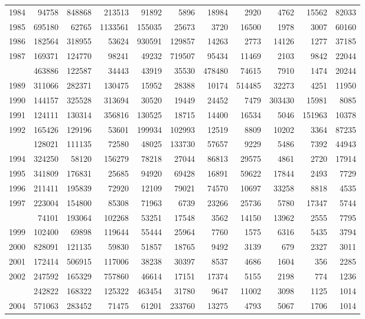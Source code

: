 \documentclass[
]{article}
\begin{document}
\begin{longtable}[t]{lrrrrrrrrrr}
1984 & 94758 & 848868 & 213513 & 91892 & 5896 & 18984 & 2920 & 4762 & 15562 & 82033\\
1985 & 695180 & 62765 & 1133561 & 155035 & 25673 & 3720 & 16500 & 1978 & 3007 & 60160\\
1986 & 182564 & 318955 & 53624 & 930591 & 129857 & 14263 & 2773 & 14126 & 1277 & 37185\\
1987 & 169371 & 124770 & 98241 & 49232 & 719507 & 95434 & 11469 & 2103 & 9842 & 22044\\
\addlinespace
1988 & 463886 & 122587 & 34443 & 43919 & 35530 & 478480 & 74615 & 7910 & 1474 & 20244\\
1989 & 311066 & 282371 & 130475 & 15952 & 28388 & 10174 & 514485 & 32273 & 4251 & 11950\\
1990 & 144157 & 325528 & 313694 & 30520 & 19449 & 24452 & 7479 & 303430 & 15981 & 8085\\
1991 & 124111 & 130314 & 356816 & 130525 & 18715 & 14400 & 16534 & 5046 & 151963 & 10378\\
1992 & 165426 & 129196 & 53601 & 199934 & 102993 & 12519 & 8809 & 10202 & 3364 & 87235\\
\addlinespace
1993 & 128021 & 111135 & 72580 & 48025 & 133730 & 57657 & 9229 & 5486 & 7392 & 44943\\
1994 & 324250 & 58120 & 156279 & 78218 & 27044 & 86813 & 29575 & 4861 & 2720 & 17914\\
1995 & 341809 & 176831 & 25685 & 94920 & 69428 & 16891 & 59622 & 17844 & 2493 & 7729\\
1996 & 211411 & 195839 & 72920 & 12109 & 79021 & 74570 & 10697 & 33258 & 8818 & 4535\\
1997 & 223004 & 154800 & 85308 & 71963 & 6739 & 23266 & 25736 & 5780 & 17347 & 5744\\
\addlinespace
1998 & 74101 & 193064 & 102268 & 53251 & 17548 & 3562 & 14150 & 13962 & 2555 & 7795\\
1999 & 102400 & 69898 & 119644 & 55444 & 25964 & 7760 & 1575 & 6316 & 5435 & 3794\\
2000 & 828091 & 121135 & 59830 & 51857 & 18765 & 9492 & 3139 & 679 & 2327 & 3011\\
2001 & 172414 & 506915 & 117006 & 38238 & 30397 & 8537 & 4686 & 1604 & 356 & 2285\\
2002 & 247592 & 165329 & 757860 & 46614 & 17151 & 17374 & 5155 & 2198 & 774 & 1236\\
\addlinespace
2003 & 242822 & 168322 & 125322 & 463454 & 31780 & 9647 & 11002 & 3098 & 1125 & 1014\\
2004 & 571063 & 283452 & 71475 & 61201 & 233760 & 13275 & 4793 & 5067 & 1706 & 1014\\

\end{longtable}
\end{document}
